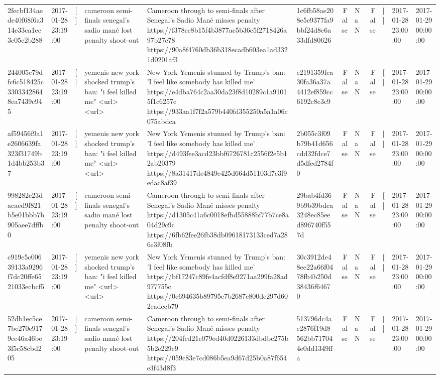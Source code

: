 \begin{tabular}{llllllrlrlll}
2fecbf134aede40f68f6a314e33ca1ec3e05c2b288 & 2017-01-28 23:19:00 & [] & cameroon semi-finals senegal's sadio mané lost penalty shoot-out & Cameroon through to semi-finals after Senegal’s Sadio Mané misses penalty https://f378cc8b15f4b3877ac5b36e5f2718426a97b27c78 https://90a8f4760db36b318ecadb603ea1ad3321d0201af3 & 1c6fb58ae208e5e9377fa9bbf24d8c6a33dfd80626 & False & NaN & False & [] & 2017-01-28 23:00:00 & 2017-01-29 00:00:00 \\
244005e79dfc6c518425c33033428648ea7439c945 & 2017-01-28 23:19:00 & [] & yemenis new york shocked trump's ban: "i feel killed me" <url> <url> & New York Yemenis stunned by Trump's ban: 'I feel like somebody has killed me' https://e4dba764c2aa30da23f8d10289c1a91015f1c6257e https://933aa1f7f2a579b440fd355250a5a1a06c075abdca & c2191359fea30fa36a37a4412ef859cc6192c8c3c9 & False & NaN & False & [] & 2017-01-28 23:00:00 & 2017-01-29 00:00:00 \\
af59456f9a1e2606639fa323f31749b1d4bb253b37 & 2017-01-28 23:19:00 & [] & yemenis new york shocked trump's ban: "i feel killed me" <url> <url> & New York Yemenis stunned by Trump's ban: 'I feel like somebody has killed me' https://d493fee3acd23bbf6726781c2556f2e5b12ab20379 https://8a31417de4849e425d664d51103d7c3f9edac8af39 & 2b055c3f09b79b41d656cdd32fdce7d5dfed2784f0 & False & NaN & False & [] & 2017-01-28 23:00:00 & 2017-01-29 00:00:00 \\
998282c23dacaed9f821b5e01bbb7b905aee7dffb0 & 2017-01-28 23:19:00 & [] & cameroon semi-finals senegal's sadio mané lost penalty shoot-out & Cameroon through to semi-finals after Senegal’s Sadio Mané misses penalty https://d1305c41a6c0018efbd55888bf77b7ce8a04d29c9c https://6fb62fee26fb38db09618173133ced7a286e3f08fb & 29bab4fd369b9b39bdca3248ec85eed896740f557d & False & NaN & False & [] & 2017-01-28 23:00:00 & 2017-01-29 00:00:00 \\
c919e5c00639133a9296f7dc20ffe6521033ecbcf5 & 2017-01-28 23:19:00 & [] & yemenis new york shocked trump's ban: "i feel killed me" <url> <url> & New York Yemenis stunned by Trump's ban: 'I feel like somebody has killed me' https://bf17247c89fe4acfdf8e9271aa299fa28ad977755c https://0c694635b89795c7b2687c800de297d602eadccb79 & 30c3912de48ee22a66f0478fb4b250d38436f64670 & False & NaN & False & [] & 2017-01-28 23:00:00 & 2017-01-29 00:00:00 \\
52db1ec5ce7bc270e9179ce46a46be3f5c58cbd205 & 2017-01-28 23:19:00 & [] & cameroon semi-finals senegal's sadio mané lost penalty shoot-out & Cameroon through to semi-finals after Senegal’s Sadio Mané misses penalty https://204fcd21c079ed40d0226133dbdbc275b5b2e229c9 https://059c83e7cd086b5ea9d67d25b0a87f654e3f43d8f3 & 513796dc4ac2876f19d8562bb717044e0dd1349ffa & False & NaN & False & [] & 2017-01-28 23:00:00 & 2017-01-29 00:00:00 \\

\end{tabular}
